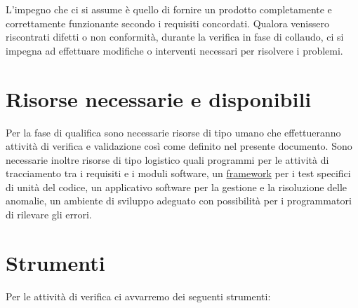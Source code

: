 L'impegno che ci si assume \`e quello di fornire un prodotto completamente e
correttamente funzionante secondo i requisiti concordati. Qualora venissero
riscontrati difetti o non conformit\`a, durante la verifica in fase di collaudo,
ci si impegna ad effettuare modifiche o interventi necessari per risolvere i
problemi.

\section{Risorse necessarie e disponibili}

Per la fase di qualifica sono necessarie risorse di tipo umano che
effettueranno attivit\`a di verifica e validazione cos\`i come definito nel
presente documento. Sono necessarie inoltre risorse di tipo logistico quali
programmi per le attivit\`a di tracciamento tra i requisiti e i moduli software,
un \underline{framework} per i test specifici di unit\`a del codice, un
applicativo software per la gestione e la risoluzione delle anomalie, un ambiente di sviluppo
adeguato con possibilit\`a per i programmatori di rilevare gli errori.


\section{Strumenti}

Per le attivit\`a di verifica ci avvarremo dei seguenti strumenti:

